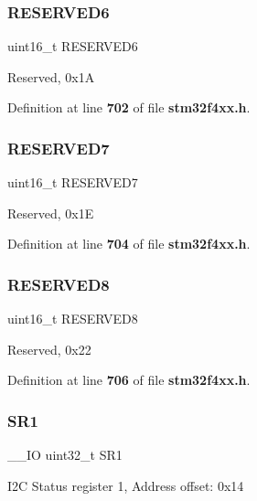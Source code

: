 \subsubsection{R\+E\+S\+E\+R\+V\+E\+D6}
{\footnotesize\ttfamily uint16\+\_\+t R\+E\+S\+E\+R\+V\+E\+D6}

Reserved, 0x1A 

Definition at line \textbf{ 702} of file \textbf{ stm32f4xx.\+h}.

\mbox{\label{structI2C__TypeDef_ab1820c97e368d349f5f4121f015d9fab}} 
\subsubsection{R\+E\+S\+E\+R\+V\+E\+D7}
{\footnotesize\ttfamily uint16\+\_\+t R\+E\+S\+E\+R\+V\+E\+D7}

Reserved, 0x1E 

Definition at line \textbf{ 704} of file \textbf{ stm32f4xx.\+h}.

\mbox{\label{structI2C__TypeDef_afc22764fbf9ee7ce28174d65d0260f18}} 
\subsubsection{R\+E\+S\+E\+R\+V\+E\+D8}
{\footnotesize\ttfamily uint16\+\_\+t R\+E\+S\+E\+R\+V\+E\+D8}

Reserved, 0x22 

Definition at line \textbf{ 706} of file \textbf{ stm32f4xx.\+h}.

\mbox{\label{structI2C__TypeDef_acefca4fd83c4b7846ae6d3cfe7bb8df9}} 
\subsubsection{S\+R1\hspace{0.1cm}{\footnotesize\ttfamily [1/2]}}
{\footnotesize\ttfamily \+\_\+\+\_\+\+IO uint32\+\_\+t S\+R1}

I2C Status register 1, Address offset\+: 0x14 

